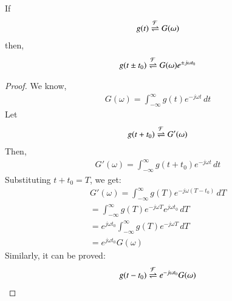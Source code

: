 \documentclass[journal,12pt,twocolumn]{IEEEtran}
\begin{document}
\begin{lemma}
If 
\begin{align}
    g(t) \overset{\mathcal{F}}{ \rightleftharpoons} G(\omega)
\end{align}
then,
\begin{align}
    g(t \pm t_0) \overset{\mathcal{F}}{ \rightleftharpoons} G(\omega)e^{\pm j\omega t_0}
\end{align}
\label{shift}
\end{lemma} 

\begin{proof}
We know, 
\begin{align}
    G(\omega) = \int_{-\infty}^\infty g(t) e^{-j \omega t} \,dt
\end{align}
Let 
\begin{align}
    g(t + t_0) \overset{\mathcal{F}}{ \rightleftharpoons} G'(\omega)
\end{align}
Then,
\begin{align}
    G'(\omega) = \int_{-\infty}^\infty g(t + t_0) e^{-j \omega t} \,dt
\end{align}
Substituting $t + t_0 = T$, we get:
\begin{align}
    G'(\omega) = \int_{-\infty}^\infty g(T) e^{-j \omega (T - t_0)} \,dT\\
     = \int_{-\infty}^\infty g(T) e^{-j \omega T} e^{j \omega t_0} \,dT\\
      =e^{j \omega t_0} \int_{-\infty}^\infty g(T) e^{-j \omega T} \,dT\\
       = e^{j \omega t_0}G(\omega)
\end{align}
Similarly, it can be proved:
 \begin{align}
     g(t - t_0) \overset{\mathcal{F}}{ \rightleftharpoons} e^{-j\omega t_0}G(\omega)
 \end{align}
\end{proof}
\end{document}
